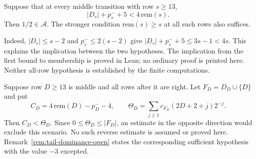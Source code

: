 \begin{thm}
\label{thm:middle-producer-escape}
Suppose that at every middle transition with row $s\ge13$,
\[
 |D_s|+p_s^-+5<4\,\mathrm{rem}(s).
\]
Then $1/2\in\mathcal A$.  The stronger condition
$\mathrm{rem}(s)\ge s$ at all such rows also suffices.
\end{thm}
Indeed, $|D_s|\le s-2$ and $p_s^-\le2(s-2)$ give
$|D_s|+p_s^-+5\le3s-1<4s$.  This explains the implication
between the two hypotheses.  The implication from the first bound to
membership is proved in Lean; no ordinary proof is printed here.  Neither all-row hypothesis
is established by the finite computations.

\begin{thm}
\label{thm:middle-allright-defect}
Suppose row $D\ge13$ is middle and all rows after it are right.
Let $F_D=D_D\cup\{D\}$ and put
\[
 C_D=4\,\mathrm{rem}(D)-p_D^--4,\qquad
 \Theta_D=\sum_{j\ge1}c_{F_D}(2D+2+j)2^{-j}.
\]
Then $C_D<\Theta_D$.  Since $0\le\Theta_D\le|F_D|$,
an estimate in the opposite direction would exclude this scenario.
No such reverse estimate is assumed or proved here.
Remark~\ref{rem:tail-dominance-open} states the corresponding sufficient
hypothesis with the value $-3$ excepted.
\end{thm}

